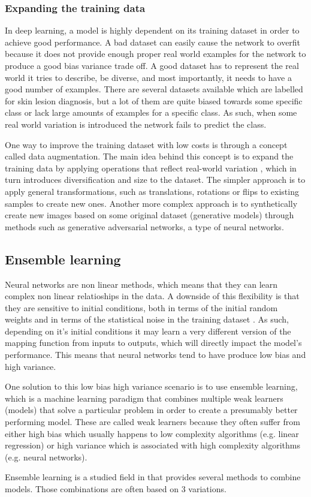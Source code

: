 \subsubsection{Expanding the training data}
    In deep learning, a model is highly dependent on its training dataset in order to achieve good performance.
    A bad dataset can easily cause the network to overfit because it does not provide enough proper real world examples for the network to produce a good bias variance trade off. A good dataset has to represent the real world it tries to describe, be diverse, and most importantly, it needs to have a good number of examples.
    There are several datasets available which are labelled for skin lesion diagnosis, but a lot of them are quite biased towards some specific class or lack large amounts of examples for a specific class. As such, when some real world variation is introduced the network fails to predict the class. \par
    One way to improve the training dataset with low costs is through a concept called data augmentation. The main idea behind this concept is to expand the training data by applying operations that reflect real-world variation \cite{Nielsen2017a}, which in turn introduces diversification and size to the dataset. The simpler approach is to apply general transformations, such as translations, rotations or flips to existing samples to create new ones. Another more complex approach is to synthetically create new images based on some original dataset (generative models) through methods such as generative adversarial networks, a type of neural networks.


\subsection{Ensemble learning}
    Neural networks are non linear methods, which means that they can learn complex non linear relatioships in the data. A downside of this flexibility is that they are sensitive to initial conditions, both in terms of the initial random weights and in terms of the statistical noise in the training dataset \cite{Brownlee}. As such, depending on it's initial conditions it may learn a very different version of the mapping function from inputs to outputs, which will directly impact the model's performance. This means that neural networks tend to have produce low bias and high variance. \par
    One solution to this low bias high variance scenario is to use ensemble learning, which is a machine learning paradigm that combines multiple weak learners (models) that solve a particular problem in order to create a presumably better performing model. These are called weak learners because they often suffer from either high bias which usually happens to low complexity algorithms (e.g. linear regression) or high variance which is associated with high complexity algorithms (e.g. neural networks). \par
    Ensemble learning is a studied field in that provides several methods to combine models. Those combinations are often based on 3 variations.

